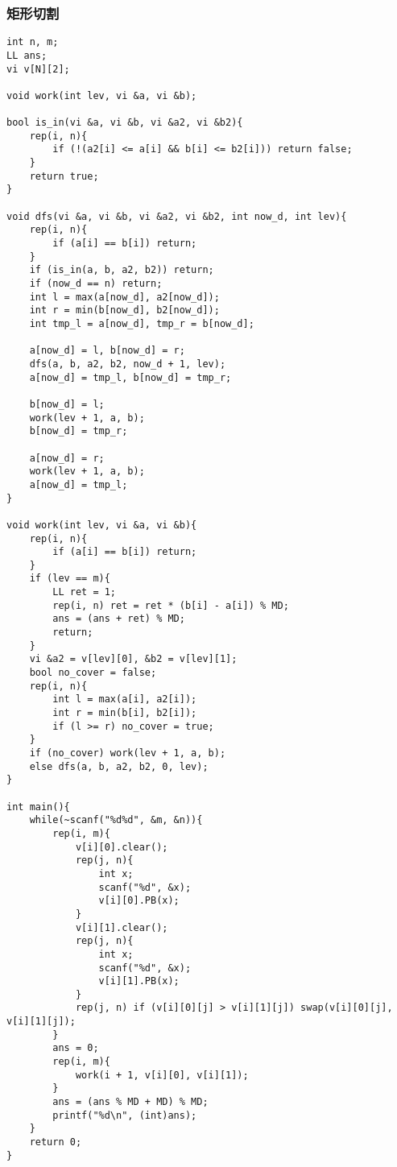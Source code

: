 \subsubsection{矩形切割}
\begin{verbatim}
int n, m;
LL ans;
vi v[N][2];

void work(int lev, vi &a, vi &b);

bool is_in(vi &a, vi &b, vi &a2, vi &b2){
    rep(i, n){
        if (!(a2[i] <= a[i] && b[i] <= b2[i])) return false;
    }
    return true;
}

void dfs(vi &a, vi &b, vi &a2, vi &b2, int now_d, int lev){
    rep(i, n){
        if (a[i] == b[i]) return;
    }
    if (is_in(a, b, a2, b2)) return;
    if (now_d == n) return;
    int l = max(a[now_d], a2[now_d]);
    int r = min(b[now_d], b2[now_d]);
    int tmp_l = a[now_d], tmp_r = b[now_d];

    a[now_d] = l, b[now_d] = r;
    dfs(a, b, a2, b2, now_d + 1, lev);
    a[now_d] = tmp_l, b[now_d] = tmp_r;

    b[now_d] = l;
    work(lev + 1, a, b);
    b[now_d] = tmp_r;

    a[now_d] = r;
    work(lev + 1, a, b);
    a[now_d] = tmp_l;
}

void work(int lev, vi &a, vi &b){
    rep(i, n){
        if (a[i] == b[i]) return;
    }
    if (lev == m){
        LL ret = 1;
        rep(i, n) ret = ret * (b[i] - a[i]) % MD;
        ans = (ans + ret) % MD;
        return;
    }
    vi &a2 = v[lev][0], &b2 = v[lev][1];
    bool no_cover = false;
    rep(i, n){
        int l = max(a[i], a2[i]);
        int r = min(b[i], b2[i]);
        if (l >= r) no_cover = true;
    }
    if (no_cover) work(lev + 1, a, b);
    else dfs(a, b, a2, b2, 0, lev);
}

int main(){
    while(~scanf("%d%d", &m, &n)){
        rep(i, m){
            v[i][0].clear();
            rep(j, n){
                int x;
                scanf("%d", &x);
                v[i][0].PB(x);
            }
            v[i][1].clear();
            rep(j, n){
                int x;
                scanf("%d", &x);
                v[i][1].PB(x);
            }
            rep(j, n) if (v[i][0][j] > v[i][1][j]) swap(v[i][0][j], v[i][1][j]);
        }
        ans = 0;
        rep(i, m){
            work(i + 1, v[i][0], v[i][1]);
        }
        ans = (ans % MD + MD) % MD;
        printf("%d\n", (int)ans);
    }
    return 0;
}
\end{verbatim}
